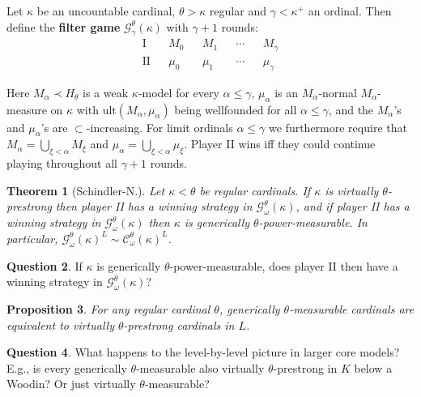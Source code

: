 \documentclass{amsart}
\newtheorem{theorem}{Theorem}[section]
\newtheorem{proposition}[theorem]{Proposition}
\theoremstyle{definition}
\newtheorem{question}[theorem]{Question}
\newcommand{\C}{\mathcal C}
\newcommand{\G}{\mathcal G}
\newcommand{\ult}{\mathrm{ult}}
\begin{document}
  Let $\kappa$ be an uncountable cardinal, $\theta>\kappa$ regular and $\gamma<\kappa^+$ an ordinal. Then define the \textbf{filter game} $\G^\theta_\gamma(\kappa)$ with $\gamma{+}1$ rounds:
  \[
    \begin{array}{cccccccccc}
      \text{I} && M_0 && M_1 && \cdots && M_\gamma\\
      \text{II} && \mu_0 && \mu_1 && \cdots && \mu_\gamma
    \end{array}
  \]

  Here $M_\alpha\prec H_\theta$ is a weak $\kappa$-model for every $\alpha\leq\gamma$, $\mu_\alpha$ is an $M_\alpha$-normal $M_\alpha$-measure on $\kappa$ with $\ult(M_\alpha,\mu_\alpha)$ being wellfounded for all $\alpha\leq\gamma$, and the $M_\alpha$'s and $\mu_\alpha$'s are $\subset$-increasing. For limit ordinals $\alpha\leq\gamma$ we furthermore require that $M_\alpha=\bigcup_{\xi<\alpha}M_\xi$ and $\mu_\alpha=\bigcup_{\xi<\alpha}\mu_\xi$. Player II wins iff they could continue playing throughout all $\gamma{+}1$ rounds.

\begin{theorem}[Schindler-N.]
  Let $\kappa<\theta$ be regular cardinals. If $\kappa$ is virtually $\theta$-prestrong then player II has a winning strategy in $\G^\theta_\omega(\kappa)$, and if player II has a winning strategy in $\G_\omega^\theta(\kappa)$ then $\kappa$ is generically $\theta$-power-measurable. In particular, $\G^\theta_\omega(\kappa)^L\sim\C^\theta_\omega(\kappa)^L$.
\end{theorem}

\begin{question} 
If $\kappa$ is generically $\theta$-power-measurable, does player II then have a winning strategy in $\mathcal{G}^\theta_\omega(\kappa)$? 
\end{question} 

\begin{proposition}
  For any regular cardinal $\theta$, generically $\theta$-measurable cardinals are equivalent to virtually $\theta$-prestrong cardinals in $L$.
\end{proposition}

\begin{question} 
What happens to the level-by-level picture in larger core models? E.g., is every generically $\theta$-measurable also virtually $\theta$-prestrong in $K$ below a Woodin? Or just virtually $\theta$-measurable?
\end{question} 
\end{document}
